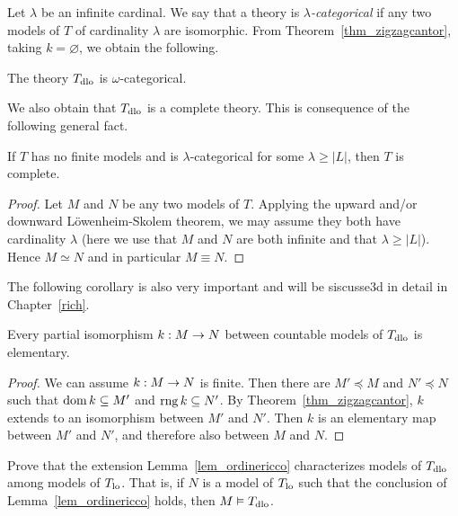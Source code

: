 Let $\lambda$ be an infinite cardinal.
We say that a theory is \emph{$\lambda$-categorical\/} if any two models of $T$ of cardinality $\lambda$ are isomorphic.
From Theorem~\ref{thm_zigzagcantor}, taking $k=\varnothing$, we obtain the following.

\begin{corollary}\label{corol_DLO_omegacat}
The theory $T_{\rm dlo}$ is $\omega$-categorical.
\end{corollary}

We also obtain that $T_{\rm dlo}$ is a complete theory.
This is consequence of the following general fact.

\begin{proposition}\label{thm_categorical->complete}
If $T$ has no finite models and is $\lambda$-categorical for some $\lambda\ge|L|$, then $T$ is complete.
\end{proposition}

\begin{proof}
Let $M$ and $N$ be any two models of $T$.
Applying the upward and/or downward L\"owenheim-Skolem theorem, we may assume they both have cardinality $\lambda$ (here we use that $M$ and $N$ are both infinite and that $\lambda\ge|L|$).
Hence $M\simeq N$ and in particular $M\equiv N$.
\end{proof}

The following corollary is also very important and will be siscusse3d in detail in Chapter~\ref{rich}.

\begin{corollary}\label{corol_DLO_QE}
  Every partial isomorphism $k:M\imp N$ between countable models of $T_{\rm dlo}$ is elementary.
\end{corollary}

\begin{proof}
  We can assume $k:M\imp N$ is finite.
  Then there are $M'\preceq M$ and  $N'\preceq N$ such that $\dom k\subseteq M'$ and $\range k\subseteq N'$.
  By Theorem~\ref{thm_zigzagcantor}, $k$ extends to an isomorphism between $M'$ and $N'$.
  Then $k$ is an elementary map between $M'$ and $N'$, and therefore also between $M$ and $N$.
\end{proof}

\begin{exercise}\label{ex_ricco->dlo}
    Prove that the extension Lemma~\ref{lem_ordinericco} characterizes models of $T_{\rm dlo}$ among models of $T_{\rm lo}$.
    That is, if $N$ is a model of $T_{\rm lo}$ such that the conclusion of Lemma~\ref{lem_ordinericco} holds, then $M\models  T_{\rm dlo}$.
\end{exercise}

